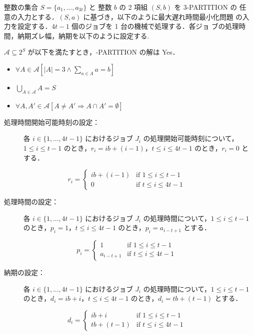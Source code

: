 \documentclass[12pt]{optlab-bachelor}
\begin{document}
整数の集合 $S = \{a_1,\ldots,a_{3t}\}$ と 整数 $b$ の 2 項組 $(S,b)$ を \textsc{3-PARTITION} の
任意の入力とする．$(S,a)$ に基づき，以下のように最大遅れ時間最小化問題
の入力を設定する．$4t - 1$ 個のジョブを 1 台の機械で処理する．各゙ジョ
ブの処理時間，納期ズレ幅，納期を以下のように設定する.

$\mathcal{A} \subseteq 2^{S}$ が以下を満たすとき，{-PARTITION} の解は Yes．
\begin{itemize}
  \item $\forall A \in \mathcal{A}[|A| = 3 \land \sum_{a \in A} a = b]$
  \item $\bigcup_{A \in \mathcal{A}} A = S$
  \item $\forall A, A' \in \mathcal{A}[A \neq A' \Rightarrow A \cap A' = \emptyset]$
\end{itemize}

\begin{description}
  \item[処理時間開始可能時刻の設定：] 各 $i \in \{1,\ldots,4t - 1\}$ におけるジョブ $J_i$ の処理開始可能時刻について，$1 \le i \le t - 1$ のとき，$r_i = ib + (i - 1)$，$t \le i \le 4t - 1$ のとき，$r_{i} = 0$ とする．
\end{description}
\begin{displaymath}
  r_i = \left\{ \begin{array}{ll} ib + (i - 1) & \text{if } 1 \le i \le t - 1 \\ 0 & \text{if } t \le i \le 4t - 1\end{array} \right.
\end{displaymath}
\begin{description}
  \item[処理時間の設定：] 各 $i \in \{1,\ldots,4t - 1\}$ におけるジョブ $J_i$ の処理時間について，$1 \le i \le t - 1$ のとき，$p_i = 1$，$t \le i \le 4t - 1$ のとき，$p_{i} = a_{i - t + 1}$ とする．
\end{description}
\begin{displaymath}
  p_i = \left\{ \begin{array}{ll} 1 & \text{if } 1 \le i \le t - 1 \\ a_{i - t + 1} & \text{if } t \le i \le 4t - 1\end{array} \right.
\end{displaymath}
\begin{description}
  \item[納期の設定：] 各 $i \in \{1,\ldots,4t - 1\}$ におけるジョブ $J_i$ の処理時間について，$1 \le i \le t - 1$ のとき，$d_i = ib + i$，$t \le i \le 4t - 1$ のとき，$d_i = tb + (t - 1)$ とする．
\end{description}
\begin{displaymath}
  d_i = \left\{ \begin{array}{ll} ib + i & \text{if } 1 \le i \le t - 1 \\ tb + (t - 1) & \text{if } t \le i \le 4t - 1\end{array} \right.
\end{displaymath}
\end{document}
